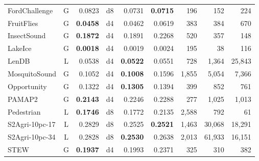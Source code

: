 \documentclass[a4paper, 11pt]{article}
\begin{document}
\begin{table}[tbp]
\begin{tabular}{lcrcrrrrr}
        FordChallenge         & G                             & 0.0823                      & d8         & 0.0731                       & \textbf{0.0715} & 196    & 152     & 224     \\
        FruitFlies            & G                             & \textbf{0.0458}             & d4         & 0.0462                       & 0.0619          & 383    & 384     & 670     \\
        InsectSound           & G                             & \textbf{0.1872}             & d4         & 0.1891                       & 0.2268          & 520    & 357     & 148     \\
        LakeIce               & G                             & \textbf{0.0018}             & d4         & 0.0019                       & 0.0024          & 195    & 38      & 116     \\
        LenDB                 & L                             & 0.0538                      & d4         & \textbf{0.0522}              & 0.0551          & 728    & 1,364   & 25,843  \\
        MosquitoSound         & G                             & 0.1052                      & d4         & \textbf{0.1008}              & 0.1596          & 1,855  & 5,054   & 7,366   \\
        Opportunity           & G                             & 0.1322                      & d4         & \textbf{0.1305}              & 0.1394          & 399    & 852     & 761     \\
        PAMAP2                & G                             & \textbf{0.2143}             & d4         & 0.2246                       & 0.2288          & 277    & 1,025   & 1,013   \\
        Pedestrian            & L                             & \textbf{0.1746}             & d8         & 0.1772                       & 0.2135          & 2,588  & 792     & 61      \\
        S2Agri-10pc-17        & L                             & 0.2829                      & d8         & 0.2525                       & \textbf{0.2521} & 1,463  & 30,068  & 18,291  \\
        S2Agri-10pc-34        & L                             & 0.2828                      & d8         & \textbf{0.2530}              & 0.2638          & 2,013  & 61,933  & 16,151  \\
        STEW                  & G                             & \textbf{0.1937}             & d4         & 0.1993                       & 0.2371          & 325    & 310     & 382     \\

\end{tabular}
\end{table}
\end{document}
